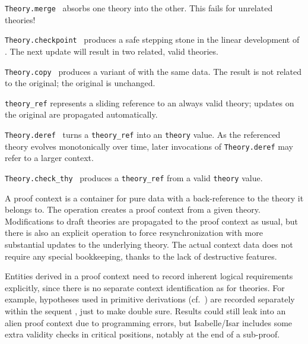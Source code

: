 \begin{isabellebody}
\begin{isamarkuptext}
\begin{description}
  \item \verb|Theory.merge|~
  absorbs one theory into the other.  This fails for unrelated
  theories!

  \item \verb|Theory.checkpoint|~ produces a safe
  stepping stone in the linear development of .  The next
  update will result in two related, valid theories.

  \item \verb|Theory.copy|~ produces a variant of  with the same data.  The result is not related to the
  original; the original is unchanged.

  \item \verb|theory_ref| represents a sliding reference to an
  always valid theory; updates on the original are propagated
  automatically.

  \item \verb|Theory.deref|~ turns a \verb|theory_ref| into an \verb|theory| value.  As the referenced
  theory evolves monotonically over time, later invocations of \verb|Theory.deref| may refer to a larger context.

  \item \verb|Theory.check_thy|~ produces a \verb|theory_ref| from a valid \verb|theory| value.

  \end{description}%
\end{isamarkuptext}%
\isamarkuptrue%
%
\endisatagmlref
{\isafoldmlref}%
%
\isadelimmlref
%
\endisadelimmlref
%
\isamarkuptrue%
%
\begin{isamarkuptext}%
A proof context is a container for pure data with a back-reference
  to the theory it belongs to.  The  operation creates a
  proof context from a given theory.  Modifications to draft theories
  are propagated to the proof context as usual, but there is also an
  explicit  operation to force resynchronization
  with more substantial updates to the underlying theory.  The actual
  context data does not require any special bookkeeping, thanks to the
  lack of destructive features.

  Entities derived in a proof context need to record inherent logical
  requirements explicitly, since there is no separate context
  identification as for theories.  For example, hypotheses used in
  primitive derivations (cf.\ ) are recorded
  separately within the sequent \isa{{\isasymGamma}\ {\isasymturnstile}\ {\isasymphi}}, just to make double
  sure.  Results could still leak into an alien proof context due to
  programming errors, but Isabelle/Isar includes some extra validity
  checks in critical positions, notably at the end of a sub-proof.


\end{isamarkuptext}
\end{isabellebody}
